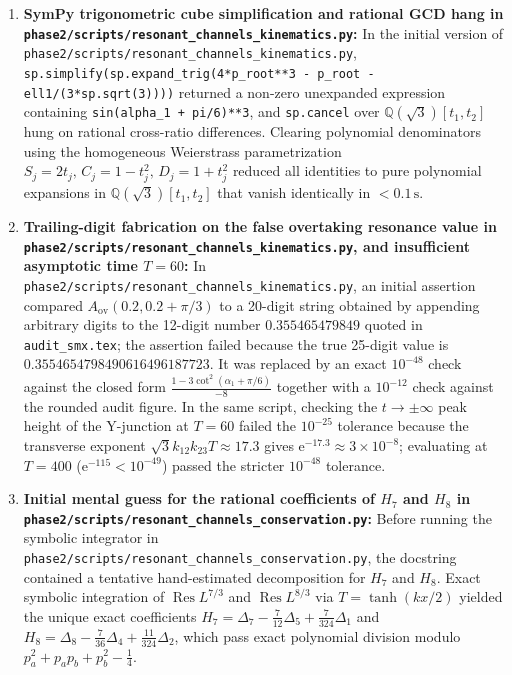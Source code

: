 \documentclass[11pt,a4paper]{article}
\newcommand{\ee}{\mathrm{e}}
\newcommand{\Res}{\operatorname{Res}}
\newcommand{\skin}{\texttt{phase2/\allowbreak scripts/\allowbreak resonant\_\allowbreak channels\_\allowbreak kinematics.py}}
\newcommand{\scons}{\texttt{phase2/\allowbreak scripts/\allowbreak resonant\_\allowbreak channels\_\allowbreak conservation.py}}
\theoremstyle{remark}
\begin{document}
\begin{enumerate}
\item \textbf{SymPy trigonometric cube simplification and rational GCD hang in \skin:}
In the initial version of \skin, \texttt{sp.simplify(sp.expand\_trig(4*p\_root**3 - p\_root - ell1/(3*sp.sqrt(3))))}
returned a non-zero unexpanded expression containing \texttt{sin(alpha\_1 + pi/6)**3},
and \texttt{sp.cancel} over $\mathbb{Q}(\sqrt{3})[t_1,t_2]$ hung on rational
cross-ratio differences. Clearing polynomial denominators using the homogeneous
Weierstrass parametrization $S_j = 2t_j,\,C_j = 1-t_j^2,\,D_j = 1+t_j^2$
reduced all identities to pure polynomial expansions in $\mathbb{Q}(\sqrt{3})[t_1,t_2]$
that vanish identically in $<0.1\,\mathrm{s}$.

\item \textbf{Trailing-digit fabrication on the false overtaking resonance value in \skin, and insufficient asymptotic time $T=60$:}
In \skin, an initial assertion compared $A_{\mathrm{ov}}(0.2,0.2+\pi/3)$ to a
20-digit string obtained by appending arbitrary digits to the 12-digit number
$0.355465479849$ quoted in \texttt{audit\_smx.tex}; the assertion failed because
the true 25-digit value is $0.3554654798490616496187723$. It was replaced by an
exact $10^{-48}$ check against the closed form $\frac{1-3\cot^2(\alpha_1+\pi/6)}{-8}$
together with a $10^{-12}$ check against the rounded audit figure. In the same
script, checking the $t\to\pm\infty$ peak height of the Y-junction at $T=60$
failed the $10^{-25}$ tolerance because the transverse exponent
$\sqrt{3}k_{12}k_{23}T \approx 17.3$ gives $\ee^{-17.3}\approx 3\times 10^{-8}$;
evaluating at $T=400$ ($\ee^{-115} < 10^{-49}$) passed the stricter $10^{-48}$
tolerance.

\item \textbf{Initial mental guess for the rational coefficients of $H_7$ and $H_8$ in \scons:}
Before running the symbolic integrator in \scons, the docstring contained a
tentative hand-estimated decomposition for $H_7$ and $H_8$. Exact symbolic
integration of $\Res L^{7/3}$ and $\Res L^{8/3}$ via $T=\tanh(kx/2)$ yielded the
unique exact coefficients $H_7 = \Delta_7 - \frac{7}{12}\Delta_5 + \frac{7}{324}\Delta_1$
and $H_8 = \Delta_8 - \frac{7}{36}\Delta_4 + \frac{11}{324}\Delta_2$, which
pass exact polynomial division modulo $p_a^2+p_a p_b+p_b^2-\frac{1}{4}$.


\end{enumerate}
\end{document}
